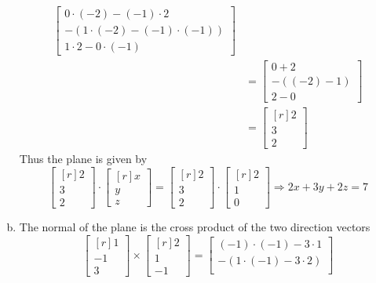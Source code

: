 \documentclass[../main.tex]{subfiles}
\begin{document}
\begin{enumerate}[a)]
\begin{align*}
\begin{bmatrix}
				0\cdot(-2) - (-1)\cdot2 \\
				-(1\cdot(-2) - (-1)\cdot(-1)) \\
				1\cdot2 - 0\cdot(-1)
			\end{bmatrix}
			\\&=
			\begin{bmatrix}
				0 + 2 \\
				-((-2) - 1) \\
				2 - 0
			\end{bmatrix}
			\\&=
			\begin{bmatrix*}[r]
				2 \\
				3 \\
				2
			\end{bmatrix*}
		\end{align*}
		Thus the plane is given by
		\[
			\begin{bmatrix*}[r]
				2 \\
				3 \\
				2
			\end{bmatrix*}
			\cdot
			\begin{bmatrix*}[r]
				x \\
				y \\
				z
			\end{bmatrix*}
			=
			\begin{bmatrix*}[r]
				2 \\
				3 \\
				2
			\end{bmatrix*}
			\cdot
			\begin{bmatrix*}[r]
				2 \\
				1 \\
				0
			\end{bmatrix*}
			\Rightarrow
			2x + 3y + 2z = 7
		\]
	\setcounter{enumi}{7}
	\item The normal of the plane is the cross product of the two direction vectors
		\[
			\begin{bmatrix*}[r]1\\-1\\3\end{bmatrix*}
			\times
			\begin{bmatrix*}[r]2\\1\\-1\end{bmatrix*}
			=
			\begin{bmatrix}
				(-1)\cdot(-1) - 3\cdot1 \\
				-(1\cdot(-1) - 3\cdot2) \\

\end{bmatrix}\]
\end{enumerate}
\end{document}
